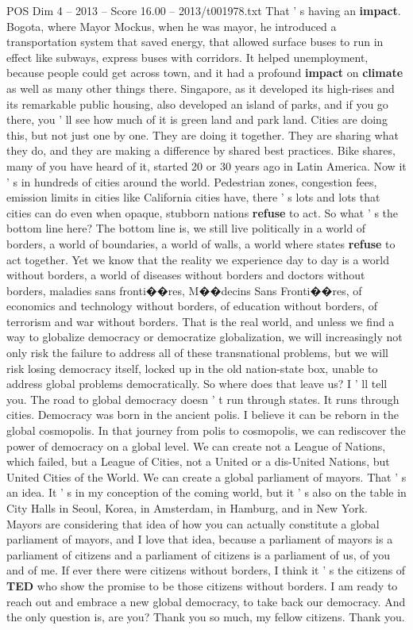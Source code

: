 \begin{textsample}{POS Dim 4 – 2013 – Score 16.00 – 2013/t001978.txt}
That ' s having an \textbf{impact}.
Bogota, where Mayor Mockus, when he was mayor, he introduced a transportation system that saved energy, that allowed surface buses to run in effect like subways, express buses with corridors.
It helped unemployment, because people could get across town, and it had a profound \textbf{impact} on \textbf{climate} as well as many other things there.
Singapore, as it developed its high-rises and its remarkable public housing, also developed an island of parks, and if you go there, you ' ll see how much of it is green land and park land.
Cities are doing this, but not just one by one.
They are doing it together.
They are sharing what they do, and they are making a difference by shared best practices.
Bike shares, many of you have heard of it, started 20 or 30 years ago in Latin America.
Now it ' s in hundreds of cities around the world.
Pedestrian zones, congestion fees, emission limits in cities like California cities have, there ' s lots and lots that cities can do even when opaque, stubborn nations \textbf{refuse} to act.
So what ' s the bottom line here?
The bottom line is, we still live politically in a world of borders, a world of boundaries, a world of walls, a world where states \textbf{refuse} to act together.
Yet we know that the reality we experience day to day is a world without borders, a world of diseases without borders and doctors without borders, maladies sans fronti{\EmojiFont �}{\EmojiFont �}res, M{\EmojiFont �}{\EmojiFont �}decins Sans Fronti{\EmojiFont �}{\EmojiFont �}res, of economics and technology without borders, of education without borders, of terrorism and war without borders.
That is the real world, and unless we find a way to globalize democracy or democratize globalization, we will increasingly not only risk the failure to address all of these transnational problems, but we will risk losing democracy itself, locked up in the old nation-state box, unable to address global problems democratically.
So where does that leave us?
I ' ll tell you.
The road to global democracy doesn ' t run through states.
It runs through cities.
Democracy was born in the ancient polis.
I believe it can be reborn in the global cosmopolis.
In that journey from polis to cosmopolis, we can rediscover the power of democracy on a global level.
We can create not a League of Nations, which failed, but a League of Cities, not a United or a dis-United Nations, but United Cities of the World.
We can create a global parliament of mayors.
That ' s an idea.
It ' s in my conception of the coming world, but it ' s also on the table in City Halls in Seoul, Korea, in Amsterdam, in Hamburg, and in New York.
Mayors are considering that idea of how you can actually constitute a global parliament of mayors, and I love that idea, because a parliament of mayors is a parliament of citizens and a parliament of citizens is a parliament of us, of you and of me.
If ever there were citizens without borders, I think it ' s the citizens of \textbf{TED} who show the promise to be those citizens without borders.
I am ready to reach out and embrace a new global democracy, to take back our democracy.
And the only question is, are you?
Thank you so much, my fellow citizens.
Thank you.


\end{textsample}
